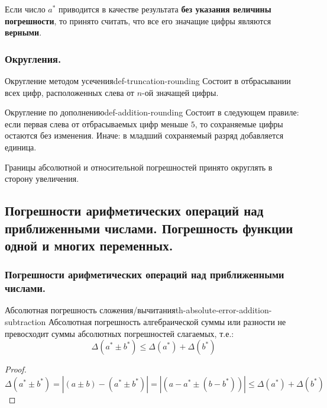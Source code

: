\documentclass[14pt]{extarticle}
\begin{document}
    Если число $a^{*}$ приводится в качестве результата \textbf{без указания величины погрешности}, то принято считать, что все его значащие цифры являются \textbf{верными}.


    \subsubsection{Округления.}

    \begin{definition}{Округление методом усечения}{def-truncation-rounding}
        Состоит в отбрасывании всех цифр, расположенных слева от $n$-ой значащей цифры.
    \end{definition}

    \begin{definition}{Округление по дополнению}{def-addition-rounding}
        Состоит в следующем правиле: если первая слева от отбрасываемых цифр меньше $5$, то сохраняемые цифры остаются без изменения. Иначе: в младший сохраняемый разряд добавляется единица.  
    \end{definition}

    Границы абсолютной и относительной погрешностей принято округлять в сторону увеличения.

\clearpage
\subsection{Погрешности арифметических операций над приближенными числами. Погрешность функции одной и многих переменных.}

    \subsubsection{Погрешности арифметических операций над приближенными числами.}
        
        \begin{theorem}{Абсолютная погрешность сложения/вычитания}{th-absolute-error-addition-subtraction}
            Абсолютная погрешность алгебраической суммы или разности не превосходит суммы абсолютных погрешностей слагаемых, т.е.:
            $$\Delta(a^{*} \pm b^{*}) \leq \Delta(a^{*}) + \Delta(b^{*})$$
        
            \begin{proof}
                $\Delta(a^{*} \pm b^{*}) = |(a \pm b) - (a^{*} \pm b^{*})| = |(a - a^{*} \pm (b - b^{*}))| \leq \Delta(a^{*}) + \Delta(b^{*})$\\
            \end{proof}
        \end{theorem}
\end{document}
